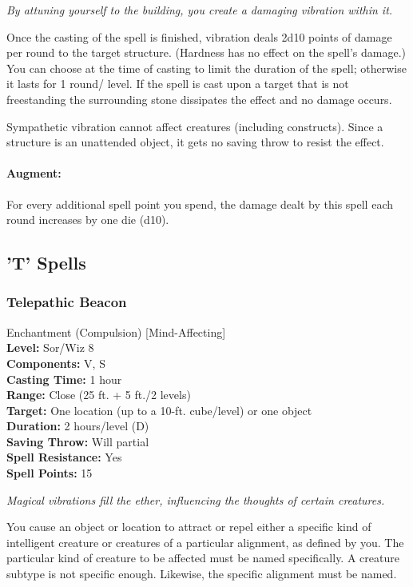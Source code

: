 \emph{By attuning yourself to the building, you create a damaging vibration within it.} 

Once the casting of the spell is finished, vibration deals 2d10 points of damage per round to the target structure. (Hardness has no effect on the spell's damage.) You can choose at the time of casting to limit the duration of the spell; otherwise it lasts for 1 round/ level. If the spell is cast upon a target that is not freestanding the surrounding stone dissipates the effect and no damage occurs.

Sympathetic vibration cannot affect creatures (including constructs). Since a structure is an unattended object, it gets no saving throw to resist the effect.

\paragraph{Augment:} For every additional spell point you spend, the damage dealt by this spell each round increases by one die (d10).
\subsection{'T' Spells}
\subsubsection{Telepathic Beacon}
\label{Spell:TelepathicBeacon}
Enchantment (Compulsion) [Mind-Affecting]
\\ \textbf{Level:} Sor/Wiz 8
\\ \textbf{Components:} V, S
\\ \textbf{Casting Time:} 1 hour
\\ \textbf{Range:} Close (25 ft. + 5 ft./2 levels)
\\ \textbf{Target:} One location (up to a 10-ft. cube/level) or one object
\\ \textbf{Duration:} 2 hours/level (D)
\\ \textbf{Saving Throw:} Will partial
\\ \textbf{Spell Resistance:} Yes
\\ \textbf{Spell Points:} 15

\emph{Magical vibrations fill the ether, influencing the thoughts of certain creatures.}

You cause an object or location to attract or repel either a specific kind of intelligent creature or creatures of a particular alignment, as defined by you. 
The particular kind of creature to be affected must be named specifically. 
A creature subtype is not specific enough. 
Likewise, the specific alignment must be named.

